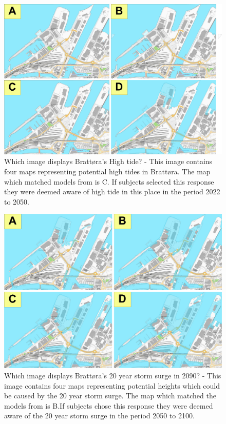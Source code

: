 \begin{figure} [H]
    \centering
    \includegraphics[width=16cm]{fig/brattora question on 2022 high tide quadrant.png}
    \caption{Which image displays Brattøra's High tide? -  This image contains four maps representing potential high tides in Brattøra. The map which matched models from \cite{kartverket_se_2021} is C. If subjects selected this response they were deemed aware of high tide in this place in the period 2022 to 2050. }
    \label{fig:Brattora_2022_hightide}
\end{figure}

\begin{figure}[H]
    \centering
    \includegraphics[width=16cm]{fig/brattora question on 2090 20 yr storm surge quadrant.png} 
    \caption{Which image displays Brattøra's 20 year storm surge in 2090? - This image contains four maps representing potential heights which could be caused by the 20 year storm surge. The map which matched the models from \cite{kartverket_se_2021} is B.If subjects chose this response they were deemed aware of the 20 year storm surge in the period 2050 to 2100. }
    \label{fig:brattora_2090_stormsurge}
\end{figure}

